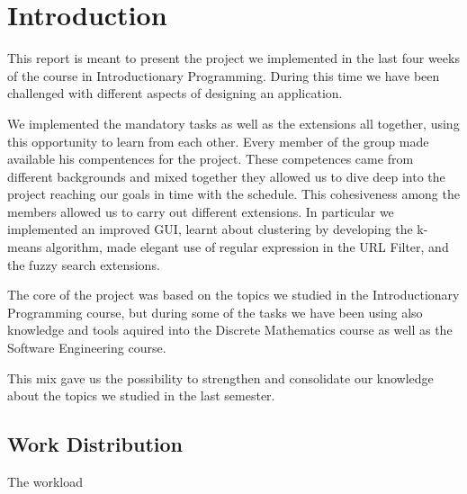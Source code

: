 \section{Introduction}
This report is meant to present the project we implemented in the last four weeks of the course in Introductionary Programming. During this time we have been challenged with different aspects of designing an application. 

We implemented the mandatory tasks as well as the extensions all together, using this opportunity to learn from each other. Every member of the group made available his compentences for the project. These competences came from different backgrounds and mixed together they allowed us to dive deep into the project reaching our goals in time with the schedule. This cohesiveness among the members allowed us to carry out different extensions. In particular we implemented an improved GUI, learnt about clustering by developing the k-means algorithm, made elegant use of regular expression in the  URL Filter, and the fuzzy search extensions.

The core of the project was based on the topics we studied in the Introductionary Programming course, but during some of the tasks we have been using also knowledge and tools aquired into the Discrete Mathematics course as well as the Software Engineering course.

This mix gave us the possibility to strengthen and consolidate our knowledge about the topics we studied in the last semester.

\subsection{Work Distribution}
The workload 